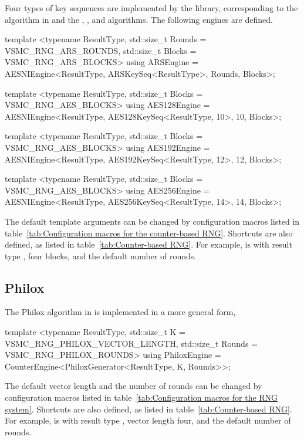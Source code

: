 Four types of key sequences are implemented by the library, corresponding to
the \ars algorithm in \textcite{Salmon:2011um} and the , , and
 algorithms. The following \rng engines are defined.
\begin{cppcode}
  template <typename ResultType, std::size_t Rounds = VSMC_RNG_ARS_ROUNDS,
      std::size_t Blocks = VSMC_RNG_ARS_BLOCKS>
  using ARSEngine =
      AESNIEngine<ResultType, ARSKeySeq<ResultType>, Rounds, Blocks>;

  template <typename ResultType, std::size_t Blocks = VSMC_RNG_AES_BLOCKS>
  using AES128Engine =
      AESNIEngine<ResultType, AES128KeySeq<ResultType, 10>, 10, Blocks>;

  template <typename ResultType, std::size_t Blocks = VSMC_RNG_AES_BLOCKS>
  using AES192Engine =
      AESNIEngine<ResultType, AES192KeySeq<ResultType, 12>, 12, Blocks>;

  template <typename ResultType, std::size_t Blocks = VSMC_RNG_AES_BLOCKS>
  using AES256Engine =
      AESNIEngine<ResultType, AES256KeySeq<ResultType, 14>, 14, Blocks>;
\end{cppcode}
The default template arguments can be changed by configuration macros listed in
table~\ref{tab:Configuration macros for the counter-based RNG}. Shortcuts are
also defined, as listed in table~\ref{tab:Counter-based RNG}. For example,
 is  with result type
, four blocks, and the default number of rounds.

\subsection{Philox}
\label{sub:Philox}

The Philox algorithm in \textcite{Salmon:2011um} is implemented in a more
general form,
\begin{cppcode}
  template <typename ResultType, std::size_t K = VSMC_RNG_PHILOX_VECTOR_LENGTH,
      std::size_t Rounds = VSMC_RNG_PHILOX_ROUNDS>
  using PhiloxEngine = CounterEngine<PhiloxGenerator<ResultType, K, Rounds>>;
\end{cppcode}
The default vector length and the number of rounds can be changed by
configuration macros listed in table~\ref{tab:Configuration macros for the RNG
  system}. Shortcuts are also defined, as listed in
table~\ref{tab:Counter-based RNG}. For example,  is
 with result type , vector
length four, and the default number of rounds.

